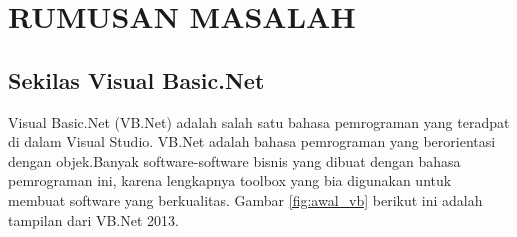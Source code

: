 \documentclass[oneside,listof=totoc]{scrbook}
\begin{document}
\chapter{RUMUSAN MASALAH}
\section{Sekilas Visual Basic.Net}
Visual Basic.Net (VB.Net) adalah salah satu bahasa pemrograman yang teradpat di dalam Visual Studio. VB.Net adalah bahasa pemrograman yang berorientasi dengan objek.Banyak software-software bisnis yang dibuat dengan bahasa pemrograman ini, karena lengkapnya toolbox yang bia digunakan untuk membuat software yang berkualitas. Gambar \ref{fig:awal_vb} berikut ini adalah tampilan dari VB.Net 2013.
\end{document}

